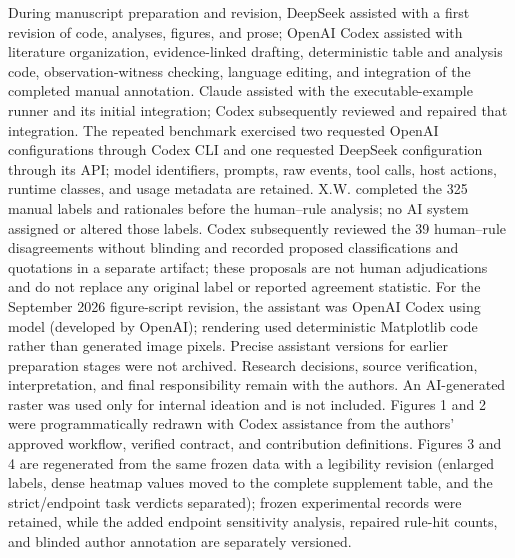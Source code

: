 During manuscript preparation and revision, DeepSeek assisted with a first revision of code, analyses, figures, and prose; OpenAI Codex assisted with literature organization, evidence-linked drafting, deterministic table and analysis code, observation-witness checking, language editing, and integration of the completed manual annotation. Claude assisted with the executable-example runner and its initial integration; Codex subsequently reviewed and repaired that integration. The repeated benchmark exercised two requested OpenAI configurations through Codex CLI and one requested DeepSeek configuration through its API; model identifiers, prompts, raw events, tool calls, host actions, runtime classes, and usage metadata are retained. X.W. completed the 325 manual labels and rationales before the human--rule analysis; no AI system assigned or altered those labels. Codex subsequently reviewed the 39 human--rule disagreements without blinding and recorded proposed classifications and quotations in a separate artifact; these proposals are not human adjudications and do not replace any original label or reported agreement statistic. For the September 2026 figure-script revision, the assistant was OpenAI Codex using model  (developed by OpenAI); rendering used deterministic Matplotlib code rather than generated image pixels. Precise assistant versions for earlier preparation stages were not archived. Research decisions, source verification, interpretation, and final responsibility remain with the authors. An AI-generated raster was used only for internal ideation and is not included. Figures 1 and 2 were programmatically redrawn with Codex assistance from the authors' approved workflow, verified contract, and contribution definitions. Figures 3 and 4 are regenerated from the same frozen data with a legibility revision (enlarged labels, dense heatmap values moved to the complete supplement table, and the strict/endpoint task verdicts separated); frozen experimental records were retained, while the added endpoint sensitivity analysis, repaired rule-hit counts, and blinded author annotation are separately versioned.
